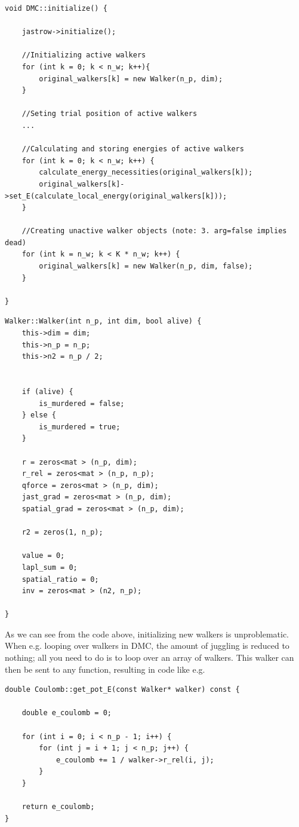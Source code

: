 \begin{lstlisting}
void DMC::initialize() {

    jastrow->initialize();

    //Initializing active walkers
    for (int k = 0; k < n_w; k++){
        original_walkers[k] = new Walker(n_p, dim);
    }
    
    //Seting trial position of active walkers
    ...

    //Calculating and storing energies of active walkers
    for (int k = 0; k < n_w; k++) {
        calculate_energy_necessities(original_walkers[k]);
        original_walkers[k]->set_E(calculate_local_energy(original_walkers[k]));
    }

    //Creating unactive walker objects (note: 3. arg=false implies dead) 
    for (int k = n_w; k < K * n_w; k++) {
        original_walkers[k] = new Walker(n_p, dim, false);
    }

}
\end{lstlisting}

\begin{lstlisting}
Walker::Walker(int n_p, int dim, bool alive) {
    this->dim = dim;
    this->n_p = n_p;
    this->n2 = n_p / 2;


    if (alive) {
        is_murdered = false;
    } else {
        is_murdered = true;
    }
    
    r = zeros<mat > (n_p, dim);
    r_rel = zeros<mat > (n_p, n_p);
    qforce = zeros<mat > (n_p, dim);
    jast_grad = zeros<mat > (n_p, dim);
    spatial_grad = zeros<mat > (n_p, dim);

    r2 = zeros(1, n_p);

    value = 0;
    lapl_sum = 0;
    spatial_ratio = 0;
    inv = zeros<mat > (n2, n_p);

}
\end{lstlisting}

As we can see from the code above, initializing new walkers is unproblematic. When e.g. looping over walkers in DMC, the amount of juggling is reduced to nothing; all you need to do is to loop over an array of walkers. This walker can then be sent to any function, resulting in code like e.g.

\vspace{0.5cm}
\begin{lstlisting}
double Coulomb::get_pot_E(const Walker* walker) const {
    
    double e_coulomb = 0;

    for (int i = 0; i < n_p - 1; i++) {
        for (int j = i + 1; j < n_p; j++) {
            e_coulomb += 1 / walker->r_rel(i, j);
        }
    }

    return e_coulomb;
}
\end{lstlisting}

